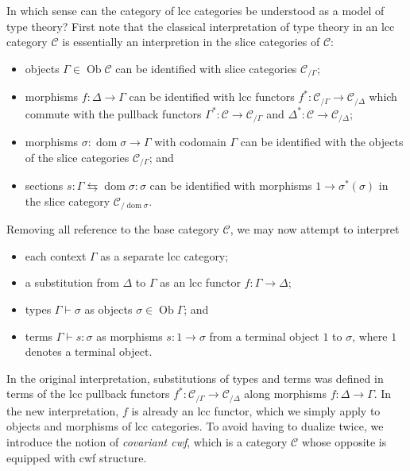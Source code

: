 \documentclass{article}
\theoremstyle{remark}
\theoremstyle{definition}
\begin{document}
In which sense can the category of lcc categories be understood as a model of type theory?
First note that the classical interpretation of type theory in an lcc category $\mathcal{C}$ is essentially an interpretion in the slice categories of $\mathcal{C}$:
\begin{itemize}
  \item
    objects $\Gamma \in \operatorname{Ob} \mathcal{C}$ can be identified with slice categories $\mathcal{C}_{/ \Gamma}$;
  \item
    morphisms $f : \Delta \rightarrow \Gamma$ can be identified with lcc functors $f^* : \mathcal{C}_{/ \Gamma} \rightarrow \mathcal{C}_{/ \Delta}$ which commute with the pullback functors $\Gamma^* : \mathcal{C} \rightarrow \mathcal{C}_{/ \Gamma}$ and $\Delta^* : \mathcal{C} \rightarrow \mathcal{C}_{/ \Delta}$;
  \item
    morphisms $\sigma : \operatorname{dom} \sigma \rightarrow \Gamma$ with codomain $\Gamma$ can be identified with the objects of the slice categories $\mathcal{C}_{/ \Gamma}$; and
  \item
    sections $s : \Gamma \leftrightarrows \operatorname{dom} \sigma : \sigma$ can be identified with morphisms $1 \rightarrow \sigma^*(\sigma)$ in the slice category $\mathcal{C}_{/ \operatorname{dom} \sigma}$.
\end{itemize}
Removing all reference to the base category $\mathcal{C}$, we may now attempt to interpret
\begin{itemize}
  \item
    each context $\Gamma$ as a separate lcc category;
  \item
    a substitution from $\Delta$ to $\Gamma$ as an lcc functor $f : \Gamma \rightarrow \Delta$;
  \item
    types $\Gamma \vdash \sigma$ as objects $\sigma \in \operatorname{Ob} \Gamma$; and
  \item
    terms $\Gamma \vdash s : \sigma$ as morphisms $s : 1 \rightarrow \sigma$ from a terminal object $1$ to $\sigma$, where $1$ denotes a terminal object.
\end{itemize}
In the original interpretation, substitutions of types and terms was defined in terms of the lcc pullback functors $f^* : \mathcal{C}_{/ \Gamma} \rightarrow \mathcal{C}_{/ \Delta}$ along morphisms $f : \Delta \rightarrow \Gamma$.
In the new interpretation, $f$ is already an lcc functor, which we simply apply to objects and morphisms of lcc categories.
To avoid having to dualize twice, we introduce the notion of \emph{covariant cwf}, which is a category $\mathcal{C}$ whose opposite is equipped with cwf structure.
\end{document}
